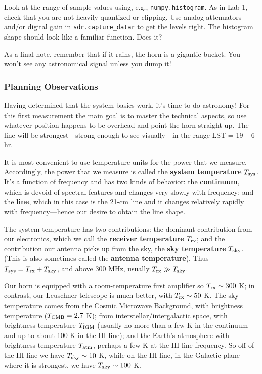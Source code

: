 \documentclass[11pt,preprint]{aastex}
\begin{document}
Look at the range of sample values using, e.g.,
  {\tt numpy.histogram}.  As in Lab 1, check that you are not heavily 
quantized or clipping.  Use analog attenuators and/or 
digital gain in {\tt sdr.capture\_datar} to get the levels right.
  The histogram shape should look like a familiar function. Does it?

As a final note, remember that if it rains, the horn is a gigantic bucket. 
You won't see any astronomical signal unless you dump it!

\subsubsection{Planning Observations}

\noindent
Having determined that the system basics work, it's time to do
astronomy! For this first measurement the main goal is to master the
technical aspects, so use whatever position happens to be overhead and
point the horn straight up. The line will be strongest---strong enough
to see visually---in the range LST = 19 -- 6 hr.

It is most convenient to use temperature units for the power
that we measure. Accordingly, the power that we measure is called the
{\bf system temperature} $T_{\rm sys}$. It's a function of frequency and has two
kinds of behavior: the {\bf continuum}, which is devoid of spectral features
and changes very slowly with frequency; and the {\bf line}, which in this
case is the 21-cm line and it changes relatively rapidly with frequency---hence our
desire to obtain the line shape.

The system temperature has two contributions: the dominant contribution
  from our electronics, which we call the {\bf receiver temperature} $T_{\rm rx}$;
  and the contribution our antenna picks up from the sky, the {\bf sky temperature}
  $T_{\rm sky}$.  (This is also sometimes called the {\bf antenna temperature}).  
 Thus $T_{\rm sys}= T_{\rm rx} + T_{\rm sky}$, and above 300 MHz, usually $T_{\rm rx} \gg T_{\rm sky}$. 

Our horn is equipped with a room-temperature first amplifier so $T_{\rm rx} \sim
300$ K; in contrast, our Leuschner telescope is much better, with $T_{\rm rx}
\sim 50$ K. The sky temperature comes from the Cosmic Microwave Background,
with brightness temperature ($T_{\rm CMB} = 2.7$ K); from
interstellar/intergalactic space, with brightness temperature
$T_{\rm IGM}$ (usually no more than a few K in the continuum and up to
about 100 K in the HI line); and the Earth's atmosphere with brightness
temperature $T_{\rm atm}$, perhaps a few K at the HI line frequency. So
off of the HI line we have $T_{\rm sky} \sim 10$ K, while on the HI line, in the
Galactic plane where it is strongest, we have $T_{\rm sky} \sim 100$ K.
\end{document}
